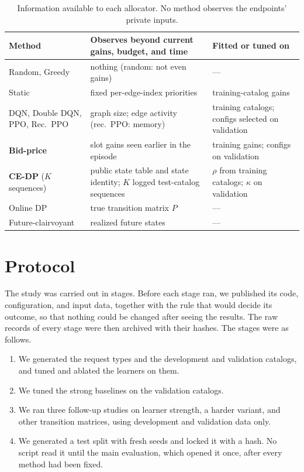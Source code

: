 \documentclass[10pt]{article}
\begin{document}
\begin{table}[t]
\centering
\caption{Information available to each allocator. No method observes the endpoints' private inputs.}
\label{tab:fairness}
\small
\begin{tabularx}{\textwidth}{@{}l>{\raggedright\arraybackslash}X>{\raggedright\arraybackslash}p{40mm}@{}}
\toprule
Method & Observes beyond current gains, budget, and time & Fitted or tuned on \\
\midrule
Random, Greedy & nothing (random: not even gains) & --- \\
Static & fixed per-edge-index priorities & training-catalog gains \\
DQN, Double DQN, PPO, Rec.\ PPO & graph size; edge activity (rec.\ PPO: memory) & 12 training catalogs; configs selected on validation \\
\textbf{Bid-price} & slot gains seen earlier in the episode & training gains; \bpConfigs{} configs on validation \\
\textbf{CE-DP} ($K$ sequences) & public state table and state identity; $K$ logged test-catalog sequences & $\rho$ from training catalogs; $\kappa$ on validation \\
Online DP & true transition matrix $P$ & --- \\
Future-clairvoyant & realized future states & --- \\
\bottomrule
\end{tabularx}
\end{table}

\section{Protocol}\label{sec:protocol}

The study was carried out in stages. Before each stage ran, we published its code, configuration, and input data, together with the rule that would decide its outcome, so that nothing could be changed after seeing the results. The raw records of every stage were then archived with their hashes. The stages were as follows.
\begin{enumerate}[leftmargin=*]
  \item We generated the request types and the development and validation catalogs, and tuned and ablated the learners on them.
  \item We tuned the strong baselines on the validation catalogs.
  \item We ran three follow-up studies on learner strength, a harder variant, and other transition matrices, using development and validation data only.
  \item We generated a test split with fresh seeds and locked it with a hash. No script read it until the main evaluation, which opened it once, after every method had been fixed.
\end{enumerate}
\end{document}
